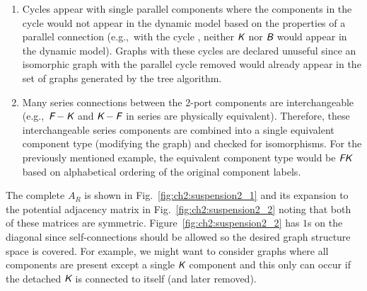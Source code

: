 \begin{enumerate}[label=$\bullet$, widest=$\bullet$, nosep]
\item Cycles appear with single parallel components where the components in the cycle would not appear in the dynamic model based on the properties of a parallel connection (e.g.,~with the cycle 
, neither $\textsl{\textsf{K}}$ nor $\textsl{\textsf{B}}$ would appear in the dynamic model). Graphs with these cycles are declared unuseful since an isomorphic graph with the parallel cycle removed would already appear in the set of graphs generated by the tree algorithm.

\item Many series connections between the 2-port components are interchangeable (e.g.,~$\textsl{\textsf{F}}-\textsl{\textsf{K}}$ and $\textsl{\textsf{K}}-\textsl{\textsf{F}}$ in series are physically equivalent). Therefore, these interchangeable series components are combined into a single equivalent component type (modifying the graph) and checked for isomorphisms. For the previously mentioned example, the equivalent component type would be $\textsl{\textsf{FK}}$ based on alphabetical ordering of the original component labels.

\end{enumerate}

The complete $A_R$ is shown in Fig.~\ref{fig:ch2:suspension2_1} and its expansion to the potential adjacency matrix in Fig.~\ref{fig:ch2:suspension2_2} noting that both of these matrices are symmetric. Figure~\ref{fig:ch2:suspension2_2} has $1$s on the diagonal since self-connections should be allowed so the desired graph structure space is covered. For example, we might want to consider graphs where all components are present except a single $\textsl{\textsf{K}}$ component and this only can occur if the detached $\textsl{\textsf{K}}$ is connected to itself (and later removed).



